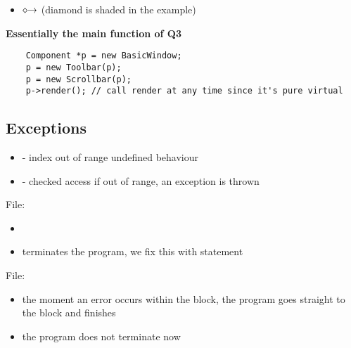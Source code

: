 \begin{itemize}
      \item {} $ \diamond\text{\textrightarrow{}} $  (diamond
            is shaded in the  example)
\end{itemize}

\textbf{Essentially the main function of Q3}
\begin{lstlisting}
    Component *p = new BasicWindow;
    p = new Toolbar(p);
    p = new Scrollbar(p);
    p->render(); // call render at any time since it's pure virtual
\end{lstlisting}

\subsection{Exceptions}
\begin{itemize}
      \item {} - index out of range \textrightarrow{} undefined behaviour
      \item {} - checked access \textrightarrow{} if  out
            of range, an  exception is thrown
\end{itemize}

File: 
\begin{itemize}
      \item {}
      \item terminates the program, we fix this with  statement
\end{itemize}

File: 
\begin{itemize}
      \item the moment an error occurs within the  block, the program
            goes straight to the  block and finishes
      \item the program does not terminate now
\end{itemize}
